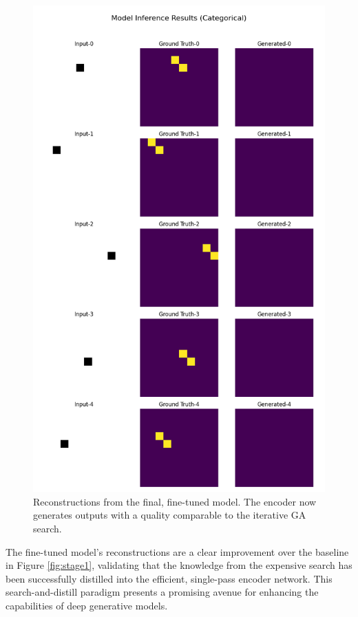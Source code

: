 \documentclass[11pt, a4paper, twocolumn]{article}
\begin{document}
\begin{figure}[H]
    \centering
    \includegraphics[width=\columnwidth]{stage3_finetuned_predictions.png}
    \caption{Reconstructions from the final, fine-tuned model. The encoder now generates outputs with a quality comparable to the iterative GA search.}
    \label{fig:stage3}
\end{figure}

The fine-tuned model's reconstructions are a clear improvement over the baseline in Figure \ref{fig:stage1}, validating that the knowledge from the expensive search has been successfully distilled into the efficient, single-pass encoder network. This search-and-distill paradigm presents a promising avenue for enhancing the capabilities of deep generative models.
\end{document}
